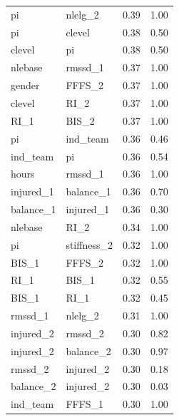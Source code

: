\documentclass[man,floatsintext]{apa6}
\begin{document}
\begin{center}
\begin{ThreePartTable}
\begin{longtable}{llll}
pi & nlelg\_2 & 0.39 & 1.00\\
pi & clevel & 0.38 & 0.50\\
clevel & pi & 0.38 & 0.50\\
nlebase & rmssd\_1 & 0.37 & 1.00\\
gender & FFFS\_2 & 0.37 & 1.00\\
clevel & RI\_2 & 0.37 & 1.00\\
RI\_1 & BIS\_2 & 0.37 & 1.00\\
pi & ind\_team & 0.36 & 0.46\\
ind\_team & pi & 0.36 & 0.54\\
hours & rmssd\_1 & 0.36 & 1.00\\
injured\_1 & balance\_1 & 0.36 & 0.70\\
balance\_1 & injured\_1 & 0.36 & 0.30\\
nlebase & RI\_2 & 0.34 & 1.00\\
pi & stiffness\_2 & 0.32 & 1.00\\
BIS\_1 & FFFS\_2 & 0.32 & 1.00\\
RI\_1 & BIS\_1 & 0.32 & 0.55\\
BIS\_1 & RI\_1 & 0.32 & 0.45\\
rmssd\_1 & nlelg\_2 & 0.31 & 1.00\\
injured\_2 & rmssd\_2 & 0.30 & 0.82\\
injured\_2 & balance\_2 & 0.30 & 0.97\\
rmssd\_2 & injured\_2 & 0.30 & 0.18\\
balance\_2 & injured\_2 & 0.30 & 0.03\\
ind\_team & FFFS\_1 & 0.30 & 1.00\\
\bottomrule
\end{longtable}

\end{ThreePartTable}
\end{center}
\end{document}
